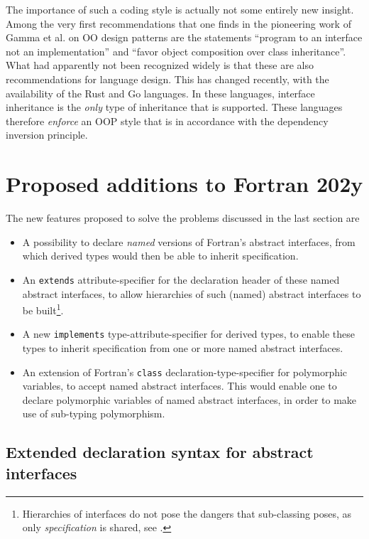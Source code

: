 \documentclass[11pt,oneside]{article}
\begin{document}
The importance of such a coding style is actually not some entirely
new insight. Among the very first recommendations that one finds in
the pioneering work of Gamma et al. \cite{Gamma_et_al_94} on OO design
patterns are the statements ``program to an interface not an
implementation'' and ``favor object composition over class
inheritance''. What had apparently not been recognized widely is that
these are also recommendations for language design. This has changed
recently, with the availability of the Rust and Go languages. In these
languages, interface inheritance is the \emph{only} type of inheritance
that is supported. These languages therefore \emph{enforce} an OOP
style that is in accordance with the dependency inversion principle.


\section{Proposed additions to Fortran 202y}
\label{sect:propositions}

The new features proposed to solve the problems discussed in the last
section are

\begin{itemize}
\item
  A possibility to declare \emph{named} versions of Fortran's abstract
  interfaces, from which derived types would then be able to inherit
  specification.
\item
  An \texttt{extends} attribute-specifier for the declaration header of
  these named abstract interfaces, to allow hierarchies of such (named)
  abstract interfaces to be built\footnote{Hierarchies of interfaces
    do not pose the dangers that sub-classing poses, as only
    \emph{specification} is shared, see \cite{Weck_Szyperski}.}.
\item
  A new \texttt{implements} type-attribute-specifier for derived types, to
  enable these types to inherit specification from one or more named
  abstract interfaces.
\item
  An extension of Fortran's \texttt{class} declaration-type-specifier
  for polymorphic variables, to accept named abstract interfaces. This
  would enable one to declare polymorphic variables of named abstract
  interfaces, in order to make use of sub-typing polymorphism.

\end{itemize}

\subsection{Extended declaration syntax for abstract interfaces}
\label{sect:declare}
\end{document}

